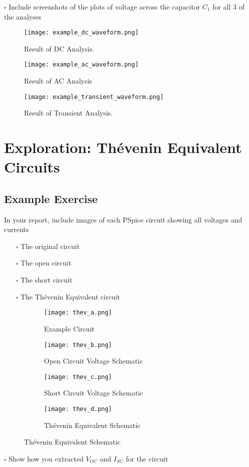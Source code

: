 \documentclass[12pt]{article}
\begin{document}
$\square$ Include screenshots of the plots of voltage across the capacitor $C_1$ for all 3 of the analyses

\begin{figure}[ht!]
\centering
\texttt{[image: example\_dc\_waveform.png]}
\caption{Result of DC Analysis.}
\end{figure}
\begin{figure}[ht!]
\centering
\texttt{[image: example\_ac\_waveform.png]}
\caption{Result of AC Analysis}
\end{figure}
\begin{figure}[ht!]
\centering
\texttt{[image: example\_transient\_waveform.png]}
\caption{Result of Transient Analysis.}
\end{figure}
\clearpage
\section{Exploration: Th\'evenin Equivalent Circuits}
\subsection{Example Exercise}
In your report, include images of each PSpice circuit showing all voltages and
currents
\begin{itemize}
\setlength\itemsep{-0.5em}
\item[$\square$] The original circuit
\item[$\square$] The open circuit
\item[$\square$] The short circuit
\item[$\square$] The Th\'evenin Equivalent circuit
\end{itemize}
\begin{figure}[ht!]
\begin{subfigure}{0.5\textwidth}
\begin{center}
\texttt{[image: thev\_a.png]}
\caption{Example Circuit}
\end{center}
\end{subfigure}
\hfill
\begin{subfigure}{0.5\textwidth}
\begin{center}
\texttt{[image: thev\_b.png]}
\caption{Open Circuit Voltage Schematic}
\end{center}
\end{subfigure}
\begin{subfigure}{0.5\textwidth}
\begin{center}
\texttt{[image: thev\_c.png]}
\vspace{0.7cm}
\caption{Short Circuit Voltage Schematic}
\end{center}
\end{subfigure}
\hfill
\begin{subfigure}{0.5\textwidth}
\begin{center}
\texttt{[image: thev\_d.png]}
\caption{Th\'evenin Equivalent Schematic}
\end{center}
\end{subfigure}
\end{figure}
$\square$ Show how you extracted $V_{OC}$ and $I_{SC}$ for the circuit
\end{document}
